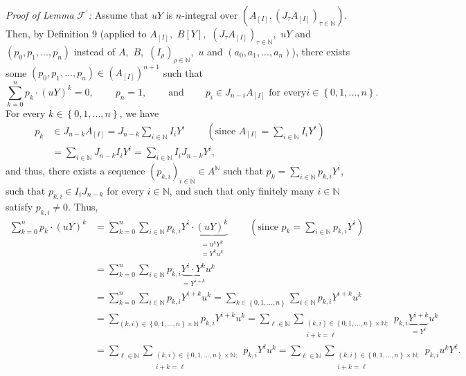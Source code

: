 \documentclass[12pt,final,notitlepage,onecolumn]{article}%
\begin{document}
\textit{Proof of Lemma }$\mathcal{F}^{\prime}$\textit{:} Assume that $uY$ is
$n$-integral over $\left(  A_{\left[  I\right]  },\left(  J_{\tau}A_{\left[
I\right]  }\right)  _{\tau\in\mathbb{N}}\right)  $. Then, by Definition 9
(applied to $A_{\left[  I\right]  },$ $B\left[  Y\right]  ,$ $\left(  J_{\tau
}A_{\left[  I\right]  }\right)  _{\tau\in\mathbb{N}},$ $uY$ and $\left(
p_{0},p_{1},...,p_{n}\right)  $ instead of $A,$ $B,$ $\left(  I_{\rho}\right)
_{\rho\in\mathbb{N}},$ $u$ and $\left(  a_{0},a_{1},...,a_{n}\right)  $),
there exists some $\left(  p_{0},p_{1},...,p_{n}\right)  \in\left(  A_{\left[
I\right]  }\right)  ^{n+1}$ such that%
\[
\sum\limits_{k=0}^{n}p_{k}\cdot\left(  uY\right)  ^{k}%
=0,\ \ \ \ \ \ \ \ \ \ p_{n}=1,\ \ \ \ \ \ \ \ \ \ \text{and}%
\ \ \ \ \ \ \ \ \ \ p_{i}\in J_{n-i}A_{\left[  I\right]  }\text{ for every
}i\in\left\{  0,1,...,n\right\}  .
\]
For every $k\in\left\{  0,1,...,n\right\}  $, we have%
\begin{align*}
p_{k}  &  \in J_{n-k}A_{\left[  I\right]  }=J_{n-k}\sum\limits_{i\in
\mathbb{N}}I_{i}Y^{i}\ \ \ \ \ \ \ \ \ \ \left(  \text{since }A_{\left[
I\right]  }=\sum\limits_{i\in\mathbb{N}}I_{i}Y^{i}\right) \\
&  =\sum\limits_{i\in\mathbb{N}}J_{n-k}I_{i}Y^{i}=\sum\limits_{i\in\mathbb{N}%
}I_{i}J_{n-k}Y^{i},
\end{align*}
and thus, there exists a sequence $\left(  p_{k,i}\right)  _{i\in\mathbb{N}%
}\in A^{\mathbb{N}}$ such that $p_{k}=\sum\limits_{i\in\mathbb{N}}p_{k,i}%
Y^{i}$, such that $p_{k,i}\in I_{i}J_{n-k}$ for every $i\in\mathbb{N}$, and
such that only finitely many $i\in\mathbb{N}$ satisfy $p_{k,i}\neq0$. Thus,%
\begin{align*}
\sum\limits_{k=0}^{n}p_{k}\cdot\left(  uY\right)  ^{k}  &  =\sum
\limits_{k=0}^{n}\sum\limits_{i\in\mathbb{N}}p_{k,i}Y^{i}\cdot\underbrace
{\left(  uY\right)  ^{k}}_{\substack{=u^{k}Y^{k}\\=Y^{k}u^{k}}%
}\ \ \ \ \ \ \ \ \ \ \left(  \text{since }p_{k}=\sum\limits_{i\in\mathbb{N}%
}p_{k,i}Y^{i}\right) \\
&  =\sum\limits_{k=0}^{n}\sum\limits_{i\in\mathbb{N}}p_{k,i}\underbrace
{Y^{i}\cdot Y^{k}}_{=Y^{i+k}}u^{k}\\
&  =\sum\limits_{k=0}^{n}\sum\limits_{i\in\mathbb{N}}p_{k,i}Y^{i+k}u^{k}%
=\sum\limits_{k\in\left\{  0,1,...,n\right\}  }\sum\limits_{i\in\mathbb{N}%
}p_{k,i}Y^{i+k}u^{k}\\
&  =\sum\limits_{\left(  k,i\right)  \in\left\{  0,1,...,n\right\}
\times\mathbb{N}}p_{k,i}Y^{i+k}u^{k}=\sum_{\ell\in\mathbb{N}}\sum
\limits_{\substack{\left(  k,i\right)  \in\left\{  0,1,...,n\right\}
\times\mathbb{N};\\i+k=\ell}}p_{k,i}\underbrace{Y^{i+k}}_{=Y^{\ell}}u^{k}\\
&  =\sum_{\ell\in\mathbb{N}}\sum\limits_{\substack{\left(  k,i\right)
\in\left\{  0,1,...,n\right\}  \times\mathbb{N};\\i+k=\ell}}p_{k,i}Y^{\ell
}u^{k}=\sum_{\ell\in\mathbb{N}}\sum\limits_{\substack{\left(  k,i\right)
\in\left\{  0,1,...,n\right\}  \times\mathbb{N};\\i+k=\ell}}p_{k,i}%
u^{k}Y^{\ell}.
\end{align*}
\end{document}
